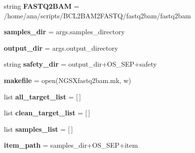 \begin{DoxyCompactItemize}
\item 
string {\bfseries F\+A\+S\+T\+Q2\+B\+AM} = \textquotesingle{}/home/ana/scripts/B\+C\+L2\+B\+A\+M2\+F\+A\+S\+TQ/fastq2bam/fastq2bam\textquotesingle{}\hypertarget{namespaceNGSXfastq2bam_a288d779168fdd59127de5bc77019bdaf}{}\label{namespaceNGSXfastq2bam_a288d779168fdd59127de5bc77019bdaf}

\item 
{\bfseries samples\+\_\+dir} = args.\+samples\+\_\+directory\hypertarget{namespaceNGSXfastq2bam_a13bf0e50ca6d875bdccd6d261dc29d87}{}\label{namespaceNGSXfastq2bam_a13bf0e50ca6d875bdccd6d261dc29d87}

\item 
{\bfseries output\+\_\+dir} = args.\+output\+\_\+directory\hypertarget{namespaceNGSXfastq2bam_a5cd8284c4cfd6d0876f66e40dc35d1ff}{}\label{namespaceNGSXfastq2bam_a5cd8284c4cfd6d0876f66e40dc35d1ff}

\item 
string {\bfseries safety\+\_\+dir} = output\+\_\+dir+O\+S\+\_\+\+S\+EP+\textquotesingle{}safety\textquotesingle{}\hypertarget{namespaceNGSXfastq2bam_add0069b27d3298b118583aa83257de65}{}\label{namespaceNGSXfastq2bam_add0069b27d3298b118583aa83257de65}

\item 
{\bfseries makefile} = open(\textquotesingle{}N\+G\+S\+Xfastq2bam.\+mk\textquotesingle{}, \textquotesingle{}w\textquotesingle{})\hypertarget{namespaceNGSXfastq2bam_a690cb9b2d8fdd6b1c5480b7f5c124e7d}{}\label{namespaceNGSXfastq2bam_a690cb9b2d8fdd6b1c5480b7f5c124e7d}

\item 
list {\bfseries all\+\_\+target\+\_\+list} = \mbox{[}$\,$\mbox{]}\hypertarget{namespaceNGSXfastq2bam_a931fcc7d2288e93eef7ad60143452a98}{}\label{namespaceNGSXfastq2bam_a931fcc7d2288e93eef7ad60143452a98}

\item 
list {\bfseries clean\+\_\+target\+\_\+list} = \mbox{[}$\,$\mbox{]}\hypertarget{namespaceNGSXfastq2bam_adfb6133ca84ed18c07047847eb8a332d}{}\label{namespaceNGSXfastq2bam_adfb6133ca84ed18c07047847eb8a332d}

\item 
list {\bfseries samples\+\_\+list} = \mbox{[}$\,$\mbox{]}\hypertarget{namespaceNGSXfastq2bam_abc8a5405a6b42973061f2f2d37fad26a}{}\label{namespaceNGSXfastq2bam_abc8a5405a6b42973061f2f2d37fad26a}

\item 
{\bfseries item\+\_\+path} = samples\+\_\+dir+O\+S\+\_\+\+S\+EP+item\hypertarget{namespaceNGSXfastq2bam_a1f3bdeb3e762e7726f1226b42f9d0ee0}{}\label{namespaceNGSXfastq2bam_a1f3bdeb3e762e7726f1226b42f9d0ee0}


\end{DoxyCompactItemize}
